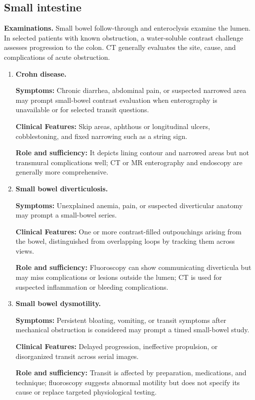 \subsection{Small intestine}
\textbf{Examinations.} Small bowel follow-through and enteroclysis examine the lumen. In selected patients with known obstruction, a water-soluble contrast challenge assesses progression to the colon. CT generally evaluates the site, cause, and complications of acute obstruction.

\begin{enumerate}[leftmargin=*,itemsep=0.45em,topsep=0.4em]
\item \textbf{Crohn disease.}\par\noindent\textbf{Symptoms:} Chronic diarrhea, abdominal pain, or suspected narrowed area may prompt small-bowel contrast evaluation when enterography is unavailable or for selected transit questions.\par\noindent\textbf{Clinical Features:} Skip areas, aphthous or longitudinal ulcers, cobblestoning, and fixed narrowing such as a string sign.\par\noindent\textbf{Role and sufficiency:} It depicts lining contour and narrowed areas but not transmural complications well; CT or MR enterography and endoscopy are generally more comprehensive.
\item \textbf{Small bowel diverticulosis.}\par\noindent\textbf{Symptoms:} Unexplained anemia, pain, or suspected diverticular anatomy may prompt a small-bowel series.\par\noindent\textbf{Clinical Features:} One or more contrast-filled outpouchings arising from the bowel, distinguished from overlapping loops by tracking them across views.\par\noindent\textbf{Role and sufficiency:} Fluoroscopy can show communicating diverticula but may miss complications or lesions outside the lumen; CT is used for suspected inflammation or bleeding complications.
\item \textbf{Small bowel dysmotility.}\par\noindent\textbf{Symptoms:} Persistent bloating, vomiting, or transit symptoms after mechanical obstruction is considered may prompt a timed small-bowel study.\par\noindent\textbf{Clinical Features:} Delayed progression, ineffective propulsion, or disorganized transit across serial images.\par\noindent\textbf{Role and sufficiency:} Transit is affected by preparation, medications, and technique; fluoroscopy suggests abnormal motility but does not specify its cause or replace targeted physiological testing.

\end{enumerate}
